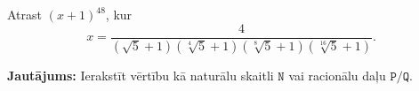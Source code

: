\documentclass[a4paper,12pt]{article}
\newcommand\answer[1]{}
\begin{document}
\vspace{10pt}
\begin{problem}

Atrast $(x+1)^{48}$, kur
\[ x = \frac{4}{(\sqrt{5}+1)(\sqrt[4]{5}+1)(\sqrt[8]{5}+1)(\sqrt[16]{5}+1)}. \]

{\bf Jautājums:} Ierakstīt vērtību kā naturālu skaitli $\mathtt{N}$ vai racionālu daļu $\mathtt{P/Q}$.
\answer{

{\bf Atbilde.} $\mathtt{125}$\\

Reizinām izteiksmes skaitītāju un saucēju ar $(\sqrt[16]{5}-1)$, lai vairākkārt izmantotu kvadrātu starpības formulu: 
\begin{align}
x = & \frac{4(\sqrt[16]{5}-1)}{(\sqrt{5}+1)(\sqrt[4]{5}+1)(\sqrt[8]{5}+1)(\sqrt[16]{5}+1)(\sqrt[16]{5}-1)} = \nonumber \\
 = &  \frac{4(\sqrt[16]{5}-1)}{(\sqrt{5}+1)(\sqrt[4]{5}+1)(\sqrt[8]{5}+1)(\sqrt[8]{5}-1)} = \nonumber \\
 = &  \frac{4(\sqrt[16]{5}-1)}{(\sqrt{5}+1)(\sqrt[4]{5}+1)(\sqrt[4]{5}-1)} = \nonumber \\
 = &  \frac{4(\sqrt[16]{5}-1)}{(\sqrt{5}+1)(\sqrt{5}-1)} = \nonumber \\
 = &  \frac{4(\sqrt[16]{5}-1)}{5-1} = \sqrt[16]{5}-1. \nonumber 
\end{align}

Tāpēc $x+1 = \sqrt[16]{5}$ un $(x+1)^{48} = 5^3 = 125$. 
}
\end{problem}
\end{document}
